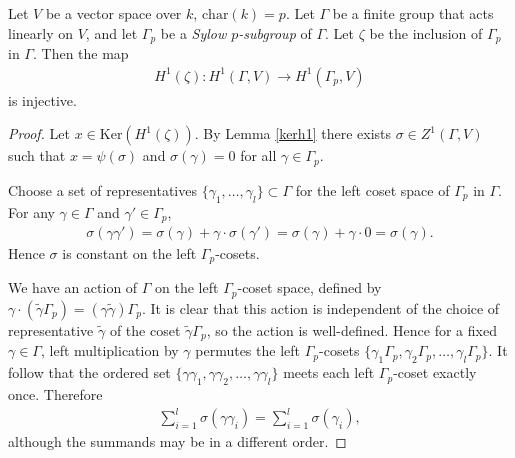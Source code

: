 \begin{lemma} \label{brown}
Let $V$ be a vector space over $k$, $\mathrm{char}(k) = p$. Let $\Gamma$ be a finite group that acts linearly on $V$, and let $\Gamma_p$ be a \emph{Sylow $p$-subgroup} of $\Gamma$. Let $\zeta$ be the inclusion of $\Gamma_p$ in $\Gamma$. Then the map 
\begin{align*}
H^1(\zeta):H^1(\Gamma, V)\rightarrow H^1(\Gamma_p, V)
\end{align*}
is injective.
\end{lemma}
\begin{proof}
	Let $x\in \mathrm{Ker}\left(H^1(\zeta)\right)$. By Lemma \ref{kerh1} there exists $\sigma \in Z^1(\Gamma, V)$ such that $x = \psi(\sigma)$ and $\sigma(\gamma) = 0$ for all $\gamma \in \Gamma_p$.
	
	Choose a set of representatives $\{\gamma_1, \ldots, \gamma_l\} \subset \Gamma$ for the left coset space of $\Gamma_p$ in $\Gamma$.
	For any $\gamma \in \Gamma$ and $\gamma' \in \Gamma_p$,
\begin{align*}
	\sigma(\gamma \gamma') = \sigma(\gamma) + \gamma \cdot \sigma(\gamma') = \sigma(\gamma) +\gamma \cdot 0 = \sigma(\gamma).
\end{align*} 
Hence $\sigma$ is constant on the left $\Gamma_p$-cosets.

We have an action of $\Gamma$ on the left $\Gamma_p$-coset space, defined by $\gamma \cdot (\widetilde{\gamma}\Gamma_p) = (\gamma\widetilde{\gamma})\Gamma_p$. It is clear that this action is independent of the choice of representative $\widetilde{\gamma}$ of the coset $\widetilde{\gamma}\Gamma_p$, so the action is well-defined. Hence for a fixed $\gamma \in \Gamma$, left multiplication by $\gamma$ permutes the left $\Gamma_p$-cosets $\{\gamma_1\Gamma_p, \gamma_2\Gamma_p, \ldots, \gamma_l\Gamma_p\}$. It follow that the ordered set $\{\gamma\gamma_1, \gamma\gamma_2, \ldots, \gamma\gamma_l\}$ meets each left $\Gamma_p$-coset exactly once. Therefore
\begin{align}\label{betaconst}
	\sum_{i=1}^l \sigma(\gamma\gamma_i) = \sum_{i=1}^l \sigma(\gamma_i),
\end{align}
although the summands may be in a different order.


\end{proof}
